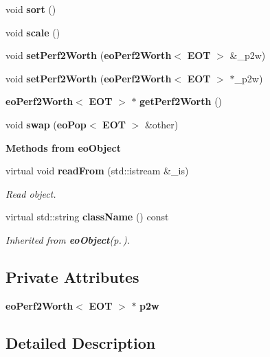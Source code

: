 \begin{CompactItemize}
\item 
void {\bf sort} ()\label{classeo_pop_a21}

\item 
void {\bf scale} ()\label{classeo_pop_a22}

\item 
void {\bf set\-Perf2Worth} ({\bf eo\-Perf2Worth}$<$ {\bf EOT} $>$ \&\_\-p2w)\label{classeo_pop_a23}

\item 
void {\bf set\-Perf2Worth} ({\bf eo\-Perf2Worth}$<$ {\bf EOT} $>$ $\ast$\_\-p2w)\label{classeo_pop_a24}

\item 
{\bf eo\-Perf2Worth}$<$ {\bf EOT} $>$ $\ast$ {\bf get\-Perf2Worth} ()\label{classeo_pop_a25}

\item 
void {\bf swap} ({\bf eo\-Pop}$<$ {\bf EOT} $>$ \&other)\label{classeo_pop_a26}

\end{CompactItemize}
\begin{Indent}{\bf Methods from eo\-Object}\par
\begin{CompactItemize}
\item 
virtual void {\bf read\-From} (std::istream \&\_\-is)
\begin{CompactList}\small\item\em Read object. \item\end{CompactList}\item 
virtual std::string {\bf class\-Name} () const 
\begin{CompactList}\small\item\em Inherited from {\bf eo\-Object}{\rm (p.\,\pageref{classeo_object})}. \item\end{CompactList}\end{CompactItemize}
\end{Indent}
\subsection*{Private Attributes}
\begin{CompactItemize}
\item 
{\bf eo\-Perf2Worth}$<$ {\bf EOT} $>$ $\ast$ {\bf p2w}\label{classeo_pop_r0}

\end{CompactItemize}


\subsection{Detailed Description}
